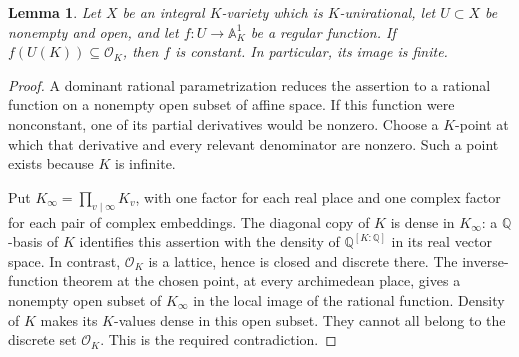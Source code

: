 \documentclass[11pt]{article}
\newtheorem{lemma}[theorem]{Lemma}
\theoremstyle{definition}
\begin{document}
\begin{lemma}\label{p3sys:unirational-function}
Let $X$ be an integral $K$-variety which is $K$-unirational, let
$U\subset X$ be nonempty and open, and let $f:U\to\mathbb A^1_K$
be a regular function.  If $f(U(K))\subseteq\mathcal O_K$, then
$f$ is constant.  In particular, its image is finite.
\end{lemma}
\begin{proof}
A dominant rational parametrization reduces the assertion to a rational
function on a nonempty open subset of affine space.  If this function
were nonconstant, one of its partial derivatives would be nonzero.
Choose a $K$-point at which that derivative and every relevant
denominator are nonzero.  Such a point exists because $K$ is infinite.

Put $K_\infty=\prod_{v\mid\infty}K_v$, with one factor for each real
place and one complex factor for each pair of complex embeddings.
The diagonal copy of $K$ is dense in $K_\infty$: a $\mathbb Q$-basis
of $K$ identifies this assertion with the density of
$\mathbb Q^{[K:\mathbb Q]}$ in its real vector space.  In contrast,
$\mathcal O_K$ is a lattice, hence is closed and discrete there.
The inverse-function theorem at the chosen point, at every
archimedean place, gives a nonempty open subset of $K_\infty$ in
the local image of the rational function.  Density of $K$ makes its
$K$-values dense in this open subset.  They cannot all belong to the
discrete set $\mathcal O_K$.  This is the required contradiction.
\end{proof}
\end{document}
